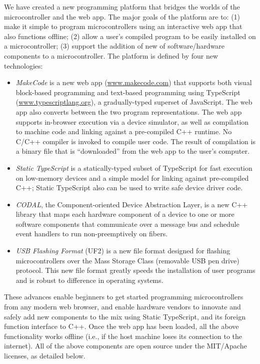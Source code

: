 We have created a new programming platform that bridges the worlds of the microcontroller
and the web app. The major goals of the platform are to: (1)
make it simple to program microcontrollers using an interactive web app that also functions offline;
(2) allow a user's compiled program to be easily installed on a microcontroller;
(3) support the addition of new of software/hardware components to a microcontroller.
The platform is defined by four new technologies:
\begin{itemize}

\item 
\noindent
\emph{MakeCode} is a new web app (\url{www.makecode.com}) that supports 
both visual block-based programming and text-based programming using TypeScript (\url{www.typescriptlang.org}), 
a gradually-typed superset of JavaScript. 
The web app also converts between the two program representations. The web app supports in-browser execution 
via a device simulator, as well as compilation to machine code and linking against a 
pre-compiled C++ runtime. No C/C++ compiler is invoked to compile user code. 
The result of compilation is a binary file that is ``downloaded'' from the web app to the user's computer. 

\item \emph{Static TypeScript} is a statically-typed subset of TypeScript for fast execution on low-memory devices 
and a simple model for linking against pre-compiled C++; Static TypeScript also can be used to write safe 
device driver code.

\item \emph{CODAL}, the Component-oriented Device Abstraction Layer, is a new C++ library that maps 
each hardware component of a device to one or more software components that communicate over a message bus and
schedule event handlers to run non-preemptively on fibers. 

\item \emph{USB Flashing Format} (UF2) is a new file format designed for flashing microcontrollers over the Mass Storage
Class (removable USB pen drive) protocol.  This new file format greatly speeds the installation of user programs
and is robust to difference in operating systems.
\end{itemize}
These advances enable beginners to get started programming microcontrollers from any modern web browser, and enable
hardware vendors to innovate and safely add new components to the mix using Static TypeScript, and its
foreign function interface to C++. Once the web app has been loaded, 
all the above functionality works offline (i.e., if the host machine loses its connection 
to the internet).
All of the above components are open source under the MIT/Apache licenses, as detailed below. 

